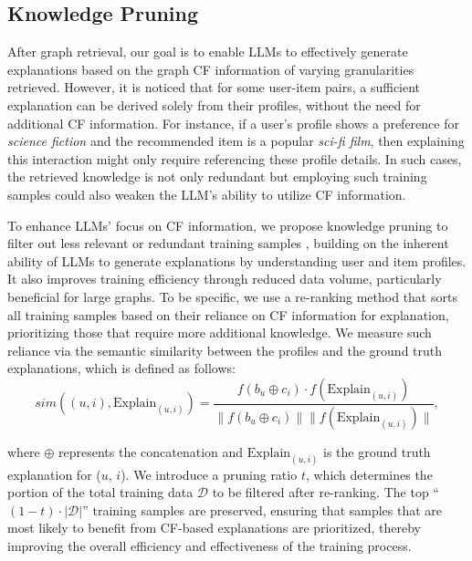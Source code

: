 \subsection{Knowledge Pruning}

 After graph retrieval, our goal is to enable LLMs to effectively generate explanations based on the graph CF information of varying granularities retrieved. However, it is noticed that for some user-item pairs, a sufficient explanation can be derived solely from their profiles, without the need for additional CF information. For instance, if a user's profile shows a preference for \textit{science fiction} and the recommended item is a popular \textit{sci-fi film}, then explaining this interaction might only require referencing these profile details. In such cases, the retrieved knowledge is not only redundant but employing such training samples could also weaken the LLM's ability to utilize CF information. 

 To enhance LLMs' focus on CF information, we propose knowledge pruning to filter out less relevant or redundant training samples \cite{peng2024graph}, building on the inherent ability of LLMs to generate explanations by understanding user and item profiles. It also improves training efficiency through reduced data volume, particularly beneficial for large graphs. To be specific, we use a re-ranking method \cite{li2022community,shen2021entity} that sorts all training samples based on their reliance on CF information for explanation, prioritizing those that require more additional knowledge. We measure such reliance via the semantic similarity between the profiles and the ground truth explanations, which is defined as follows:
\begin{equation}
sim((u, i), \text{Explain}_{(u, i)}) = \frac{f(b_u \oplus c_i) \cdot f(\text{Explain}_{(u, i)})}{\|f(b_u \oplus c_i)\| \|f(\text{Explain}_{(u, i)})\|},
\label{eq:reranking}
\end{equation}

\noindent where $\oplus$ represents the concatenation and $\text{Explain}_{(u, i)}$ is the ground truth explanation for ($u$, $i$). We introduce a pruning ratio $t$, which determines the portion of the total training data $\mathcal{D}$ to be filtered after re-ranking. The top ``$(1-t) \cdot |\mathcal{D}|$'' training samples are preserved, ensuring that samples that are most likely to benefit from CF-based explanations are prioritized, thereby improving the overall efficiency and effectiveness of the training process. 

